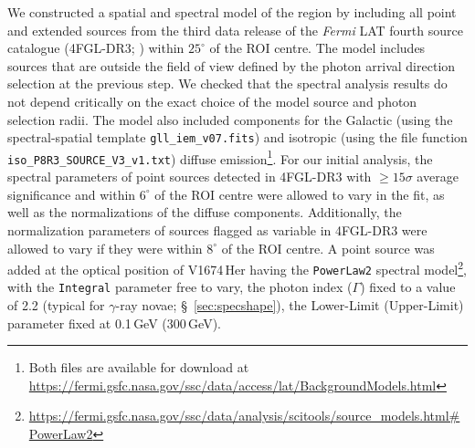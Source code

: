 \documentclass[a4paper,fleqn,usenatbib]{mnras}
\newcommand{\nova}{V1674\,Her}
\begin{document}
We constructed a spatial and spectral model of the region by including all point and extended sources from the third data release of the {\em Fermi} LAT fourth source catalogue (4FGL-DR3; \citealt{2020ApJS..247...33A}) within $25^\circ$ of the ROI centre. The model includes sources that are outside the field of view defined by the photon arrival direction selection at the previous step. 
We checked that the spectral analysis results do not depend critically on the exact choice of the model source and photon selection radii. 
The model also included components for the Galactic (using the spectral-spatial template \texttt{gll\_iem\_v07.fits}) and isotropic (using the file function \texttt{iso\_P8R3\_SOURCE\_V3\_v1.txt}) diffuse emission\footnote{Both files are available for download at \url{https://fermi.gsfc.nasa.gov/ssc/data/access/lat/BackgroundModels.html}}.
For our initial analysis, the spectral parameters of point sources detected in 4FGL-DR3 with $\geq15\sigma$ average significance and within $6^\circ$ of the ROI centre were allowed to vary in the fit, as well as the normalizations of the diffuse components.  Additionally, the normalization parameters of sources flagged as variable in 4FGL-DR3 were allowed to vary if
they were within $8^\circ$ of the ROI centre. 
A point source was added at the optical position of \nova{} having the \texttt{PowerLaw2} spectral model\footnote{\url{https://fermi.gsfc.nasa.gov/ssc/data/analysis/scitools/source_models.html\#PowerLaw2}}, 
with the \texttt{Integral} parameter free to vary, the photon index ($\Gamma$) fixed to 
a value of 2.2 (typical for $\gamma$-ray novae; \S~\ref{sec:specshape}), 
the Lower-Limit (Upper-Limit) parameter fixed at 0.1\,GeV (300\,GeV).
\end{document}
